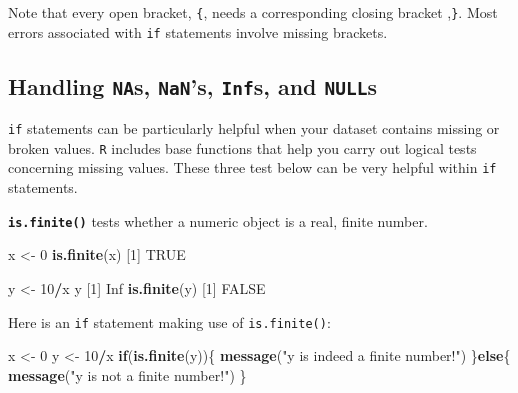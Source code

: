 \documentclass[
]{book}
\newenvironment{Shaded}{\begin{snugshade}}{\end{snugshade}}
\newcommand{\ControlFlowTok}[1]{\textcolor[rgb]{0.13,0.29,0.53}{\textbf{#1}}}
\newcommand{\DecValTok}[1]{\textcolor[rgb]{0.00,0.00,0.81}{#1}}
\newcommand{\KeywordTok}[1]{\textcolor[rgb]{0.13,0.29,0.53}{\textbf{#1}}}
\newcommand{\NormalTok}[1]{#1}
\newcommand{\OperatorTok}[1]{\textcolor[rgb]{0.81,0.36,0.00}{\textbf{#1}}}
\newcommand{\OtherTok}[1]{\textcolor[rgb]{0.56,0.35,0.01}{#1}}
\newcommand{\StringTok}[1]{\textcolor[rgb]{0.31,0.60,0.02}{#1}}
\begin{document}
Note that every open bracket, \texttt{\{}, needs a corresponding closing bracket ,\texttt{\}}. Most errors associated with \texttt{if} statements involve missing brackets.

\hypertarget{handling-nas-nans-infs-and-nulls}{%
\subsection*{\texorpdfstring{Handling \texttt{NA}s, \texttt{NaN}'s, \texttt{Inf}s, and \texttt{NULL}s}{Handling NAs, NaN's, Infs, and NULLs}}\label{handling-nas-nans-infs-and-nulls}}

\texttt{if} statements can be particularly helpful when your dataset contains missing or broken values. \texttt{R} includes base functions that help you carry out logical tests concerning missing values. These three test below can be very helpful within \texttt{if} statements.

\textbf{\texttt{is.finite()}} tests whether a numeric object is a real, finite number.

\begin{Shaded}
\begin{Highlighting}[]
\NormalTok{x <-}\StringTok{ }\DecValTok{0}
\KeywordTok{is.finite}\NormalTok{(x)}
\NormalTok{[}\DecValTok{1}\NormalTok{] }\OtherTok{TRUE}

\NormalTok{y <-}\StringTok{ }\DecValTok{10}\OperatorTok{/}\NormalTok{x}
\NormalTok{y}
\NormalTok{[}\DecValTok{1}\NormalTok{] }\OtherTok{Inf}
\KeywordTok{is.finite}\NormalTok{(y)}
\NormalTok{[}\DecValTok{1}\NormalTok{] }\OtherTok{FALSE}
\end{Highlighting}
\end{Shaded}

Here is an \texttt{if} statement making use of \texttt{is.finite()}:

\begin{Shaded}
\begin{Highlighting}[]
\NormalTok{x <-}\StringTok{ }\DecValTok{0}
\NormalTok{y <-}\StringTok{ }\DecValTok{10}\OperatorTok{/}\NormalTok{x}
\ControlFlowTok{if}\NormalTok{(}\KeywordTok{is.finite}\NormalTok{(y))\{}
  \KeywordTok{message}\NormalTok{(}\StringTok{"y is indeed a finite number!"}\NormalTok{)}
\NormalTok{\}}\ControlFlowTok{else}\NormalTok{\{}
  \KeywordTok{message}\NormalTok{(}\StringTok{"y is not a finite number!"}\NormalTok{)}
\NormalTok{\}}
\end{Highlighting}
\end{Shaded}
\end{document}
